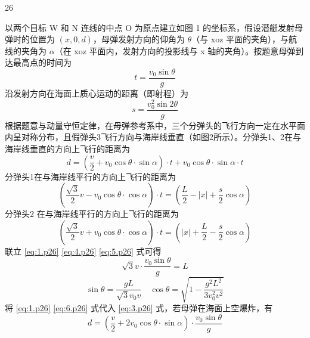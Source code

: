 \begin{solution}{26}
  \begin{subproblem}[参考解答（一）]
    以两个目标 W 和 N 连线的中点 O 为原点建立如图 1 的坐标系，假设潜艇发射母弹时的位置为 $(x,0,d)$，母弹发射方向的仰角为 $\theta$（与 xoz 平面的夹角），与航线的夹角为 $\alpha$（在 xoz 平面内，发射方向的投影线与 x 轴的夹角）。按题意母弹到达最高点的时间为
    \begin{equation}
      t = \frac{v_{0} \sin \theta}{g}
      \label{eq:1.p26}
    \end{equation}
    沿发射方向在海面上质心运动的距离（即射程）为
    \begin{equation}
      s = \frac{v_{0}^{2} \sin 2\theta}{g}
      \label{eq:2.p26}
    \end{equation}
    根据题意与动量守恒定律，在母弹参考系中，三个分弹头的飞行方向一定在水平面内呈对称分布，且假弹头3飞行方向与海岸线垂直（如图2所示）。分弹头1、2在与海岸线垂直的方向上飞行的距离为
    \begin{equation}
      d = \left(\frac{v}{2} + v_{0} \cos \theta \cdot \sin \alpha\right) \cdot t + v_{0} \cos \theta \cdot \sin \alpha \cdot t
      \label{eq:3.p26}
    \end{equation}
    分弹头1在与海岸线平行的方向上飞行的距离为
    \begin{equation}
      \left(\frac{\sqrt{3}}{2} v - v_{0} \cos \theta \cdot \cos \alpha\right) \cdot t = \left(\frac{L}{2} - |x| + \frac{s}{2} \cos \alpha\right)
      \label{eq:4.p26}
    \end{equation}
    分弹头2 在与海岸线平行的方向上飞行的距离为
    \begin{equation}
      \left(\frac{\sqrt{3}}{2} v + v_{0} \cos \theta \cdot \cos \alpha\right) \cdot t = \left(|x| + \frac{L}{2} - \frac{s}{2} \cos \alpha\right)
      \label{eq:5.p26}
    \end{equation}
    联立 \eqref{eq:1.p26} \eqref{eq:4.p26} \eqref{eq:5.p26} 式可得
    \begin{equation}
      \sqrt{3} v \cdot \frac{v_{0} \sin \theta}{g} = L
    \end{equation}
    \begin{equation}
      \sin \theta = \frac{g L}{\sqrt{3} v_{0} v} \quad \cos \theta = \sqrt{1 - \frac{g^{2} L^{2}}{3 v_{0}^{2} v^{2}}}
      \label{eq:6.p26}
    \end{equation}
    将 \eqref{eq:1.p26} \eqref{eq:6.p26} 式代入 \eqref{eq:3.p26} 式，若母弹在海面上空爆炸，有
    \begin{equation}
      d = \left(\frac{v}{2} + 2 v_{0} \cos \theta \cdot \sin \alpha\right) \cdot \frac{v_{0} \sin \theta}{g}

\end{equation}
\end{subproblem}
\end{solution}
